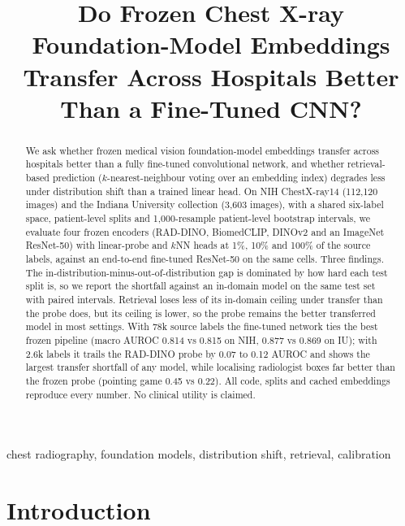 \documentclass[conference]{IEEEtran}
\begin{document}
\title{Do Frozen Chest X-ray Foundation-Model Embeddings Transfer Across Hospitals Better Than a Fine-Tuned CNN?}

\author{%
}

\maketitle

\begin{abstract}
We ask whether frozen medical vision foundation-model embeddings transfer across hospitals better than a fully fine-tuned convolutional network, and whether retrieval-based prediction ($k$-nearest-neighbour voting over an embedding index) degrades less under distribution shift than a trained linear head. On NIH ChestX-ray14 (112,120 images) and the Indiana University collection (3,603 images), with a shared six-label space, patient-level splits and 1,000-resample patient-level bootstrap intervals, we evaluate four frozen encoders (RAD-DINO, BiomedCLIP, DINOv2 and an ImageNet ResNet-50) with linear-probe and $k$NN heads at 1\%, 10\% and 100\% of the source labels, against an end-to-end fine-tuned ResNet-50 on the same cells. Three findings. The in-distribution-minus-out-of-distribution gap is dominated by how hard each test split is, so we report the shortfall against an in-domain model on the same test set with paired intervals. Retrieval loses less of its in-domain ceiling under transfer than the probe does, but its ceiling is lower, so the probe remains the better transferred model in most settings. With 78k source labels the fine-tuned network ties the best frozen pipeline (macro AUROC 0.814 vs 0.815 on NIH, 0.877 vs 0.869 on IU); with 2.6k labels it trails the RAD-DINO probe by 0.07 to 0.12 AUROC and shows the largest transfer shortfall of any model, while localising radiologist boxes far better than the frozen probe (pointing game 0.45 vs 0.22). All code, splits and cached embeddings reproduce every number. No clinical utility is claimed.
\end{abstract}

\begin{IEEEkeywords}
chest radiography, foundation models, distribution shift, retrieval, calibration
\end{IEEEkeywords}

\section{Introduction}
\end{document}
